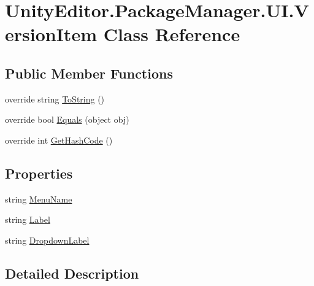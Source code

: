 \hypertarget{class_unity_editor_1_1_package_manager_1_1_u_i_1_1_version_item}{}\section{Unity\+Editor.\+Package\+Manager.\+U\+I.\+Version\+Item Class Reference}
\label{class_unity_editor_1_1_package_manager_1_1_u_i_1_1_version_item}
\subsection*{Public Member Functions}
\begin{DoxyCompactItemize}
\item 
override string \mbox{\hyperlink{class_unity_editor_1_1_package_manager_1_1_u_i_1_1_version_item_a492dc1d703e1ef977bf9ab7748eb9e04}{To\+String}} ()
\item 
override bool \mbox{\hyperlink{class_unity_editor_1_1_package_manager_1_1_u_i_1_1_version_item_af3bf093bafcabc8fa80a01e1b4f92068}{Equals}} (object obj)
\item 
override int \mbox{\hyperlink{class_unity_editor_1_1_package_manager_1_1_u_i_1_1_version_item_a6db7faf624ece352e3992e43b807164f}{Get\+Hash\+Code}} ()
\end{DoxyCompactItemize}
\subsection*{Properties}
\begin{DoxyCompactItemize}
\item 
string \mbox{\hyperlink{class_unity_editor_1_1_package_manager_1_1_u_i_1_1_version_item_ae07b13c5b5c642e61f1d06c2370d0158}{Menu\+Name}}
\item 
string \mbox{\hyperlink{class_unity_editor_1_1_package_manager_1_1_u_i_1_1_version_item_a80389f773561decd881c144a418def8f}{Label}}
\item 
string \mbox{\hyperlink{class_unity_editor_1_1_package_manager_1_1_u_i_1_1_version_item_a172dc27962da262e4b0874381e399d3d}{Dropdown\+Label}}
\end{DoxyCompactItemize}


\subsection{Detailed Description}


